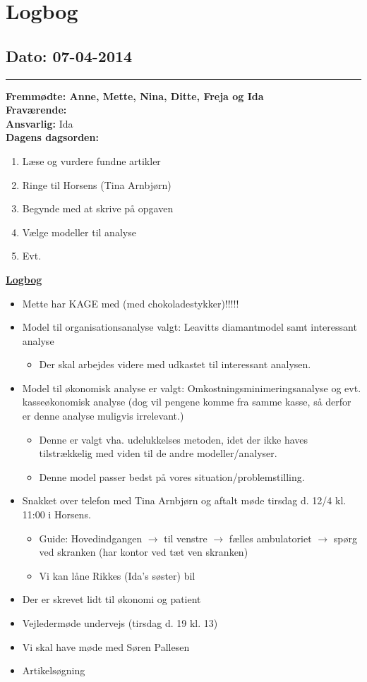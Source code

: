 \chapter{Logbog}
\section{Dato: 07-04-2014}
\hrule
\textbf{Fremmødte: Anne, Mette, Nina, Ditte, Freja og Ida} \\
\textbf{Fraværende: } \\
\textbf{Ansvarlig:} Ida  \\
\textbf{Dagens dagsorden: }
\begin{enumerate}
	\item Læse og vurdere fundne artikler
	\item Ringe til Horsens (Tina Arnbjørn)
	\item Begynde med at skrive på opgaven
	\item Vælge modeller til analyse
	\item Evt. 
\end{enumerate}

\underline{\textbf{Logbog}}
\begin{itemize}
\item Mette har KAGE med (med chokoladestykker)!!!!! 
\item Model til organisationsanalyse valgt: Leavitts diamantmodel samt interessant analyse
\begin{itemize}
\item Der skal arbejdes videre med udkastet til interessant analysen.
\end{itemize}
\item Model til økonomisk analyse er valgt: Omkostningsminimeringsanalyse og evt. kasseøkonomisk analyse (dog vil pengene komme fra samme kasse, så derfor er denne analyse muligvis irrelevant.)
\begin{itemize}
\item Denne er valgt vha. udelukkelses metoden, idet der ikke haves tilstrækkelig med viden til de andre modeller/analyser.
\item Denne model passer bedst på vores situation/problemstilling.
\end{itemize}
\item Snakket over telefon med Tina Arnbjørn og aftalt møde tirsdag d. 12/4 kl. 11:00 i Horsens.
\begin{itemize}
\item Guide: Hovedindgangen $\rightarrow$ til venstre $\rightarrow$ fælles ambulatoriet $\rightarrow$ spørg ved skranken (har kontor ved tæt ven skranken)
\item Vi kan låne Rikkes (Ida's søster) bil
\end{itemize}
\item Der er skrevet lidt til økonomi og patient
\item Vejledermøde undervejs (tirsdag d. 19 kl. 13)
\item Vi skal have møde med Søren Pallesen
\item Artikelsøgning
\end{itemize}
\newpage